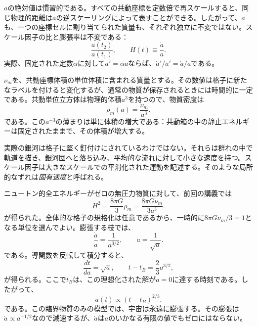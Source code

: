 \(a\)の絶対値は慣習的である。すべての共動座標を定数倍で再スケールすると、同じ物理的距離は\(a\)の逆スケーリングによって表すことができる。したがって、\(a\)も、一つの座標セルに割り当てられた質量も、それぞれ独立に不変ではない。スケール因子の比と膨張率は不変である：
\begin{equation}
\frac{a(t_2)}{a(t_1)},
\qquad
H(t)\equiv\frac{\dot a}{a}.
\label{eq:c02-hubble}
\end{equation}
実際、固定された定数\(\alpha\)に対して\(a'=\alpha a\)ならば、\(\dot a'/a'=\dot a/a\)である。

\(\nu_m\)を、共動座標体積の単位体積に含まれる質量とする。その数値は格子に新たなラベルを付けると変化するが、通常の物質が保存されるときには時間的に一定である。共動単位立方体は物理的体積\(a^3\)を持つので、物質密度は
\begin{equation}
\boxed{\rho_m(a)=\frac{\nu_m}{a^3}.}
\label{eq:c02-matter-density}
\end{equation}
である。この\(a^{-3}\)の薄まりは単に体積の増大である：共動箱の中の静止エネルギーは固定されたままで、その体積が増大する。

実際の銀河は格子に堅く釘付けにされているわけではない。それらは群れの中で軌道を描き、銀河団へと落ち込み、平均的な流れに対して小さな速度を持つ。スケール因子は大きなスケールでの平滑化された運動を記述する。そのような局所的なずれは\emph{固有速度}と呼ばれる。

\begin{classroomqa}
\end{classroomqa}

ニュートン的全エネルギーがゼロの無圧力物質に対して、前回の講義では
\begin{equation}
H^2=\frac{8\pi G}{3}\rho_m
=\frac{8\pi G\nu_m}{3a^3}.
\label{eq:c02-zero-energy-friedmann}
\end{equation}
が得られた。全体的な格子の規格化は任意であるから、一時的に\(8\pi G\nu_m/3=1\)となる単位を選んでよい。膨張する枝では、
\begin{equation}
\frac{\dot a}{a}=\frac{1}{a^{3/2}},
\qquad
\dot a=\frac{1}{\sqrt a}.
\end{equation}
である。導関数を反転して積分すると、
\begin{equation}
\frac{dt}{da}=\sqrt a,
\qquad
t-t_B=\frac{2}{3}a^{3/2},
\end{equation}
が得られる。ここで\(t_B\)は、この理想化された解が\(a=0\)に達する時刻である。したがって、
\begin{equation}
\boxed{a(t)\propto (t-t_B)^{2/3}.}
\label{eq:c02-matter-law}
\end{equation}
である。この臨界物質のみの模型では、宇宙は永遠に膨張する。その膨張は\(\dot a\propto a^{-1/2}\)なので減速するが、\(\dot a\)は\(a\)のいかなる有限の値でもゼロにはならない。

